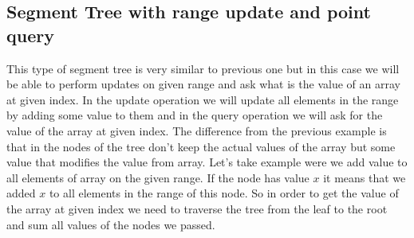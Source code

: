 \documentclass{article}
\begin{document}
\subsection{Segment Tree with range update and point query}
This type of segment tree is very similar to previous one but in this case we will be able
to perform updates on given range and ask what is the value of an array at given index.
In the update operation we will update all elements in the range by adding some value to them
and in the query operation we will ask for the value of the array at given index.
The difference from the previous example is that in the nodes of the tree don't keep the
actual values of the array but some value that modifies the value from array. 
Let's take example were we add value to all elements of array on the given range. 
If the node has value $x$ it means that we added $x$ to all elements in the range of this node.
So in order to get the value of the array at given index we need to traverse the tree 
from the leaf to the root and sum all values of the nodes we passed.
\end{document}
